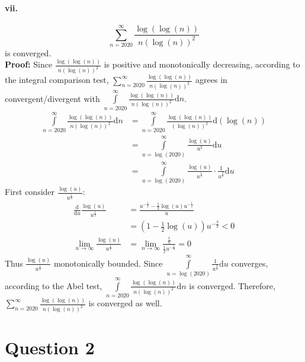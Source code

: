 \documentclass[11pt, a4paper]{article}
\begin{document}
\paragraph{vii.}
$$\sum\limits_{n=2020}^\infty \frac{\log(\log(n))}{n(\log(n))^2}$$
is converged. \\
\textbf{Proof:} Since $\frac{\log(\log(n))}{n(\log(n))^2}$ is positive and monotonically decreasing, according to the integral comparison test, $\sum\limits_{n=2020}^\infty \frac{\log(\log(n))}{n(\log(n))^2}$ agrees in convergent/divergent with $\int\limits_{n=2020}^\infty \frac{\log(\log(n))}{n(\log(n))^2} \mathrm{d}n$.
$$\begin{aligned}
    \int\limits_{n=2020}^\infty \frac{\log(\log(n))}{n(\log(n))^2} \mathrm{d}n &= \int\limits_{n=2020}^\infty \frac{\log(\log(n))}{(\log(n))^2} \mathrm{d}(\log(n)) \\
    &= \int\limits_{u=\log(2020)}^\infty \frac{\log(u)}{u^2}\mathrm{d}u \\
    &= \int\limits_{u=\log(2020)}^\infty \frac{\log(u)}{u^{\frac{1}{2}}} \cdot \frac{1}{u^{\frac{3}{2}}}\mathrm{d}u
\end{aligned}$$
First consider $\frac{\log(u)}{u^{\frac{1}{2}}}$:
$$\begin{aligned}
    \frac{\mathrm{d}}{\mathrm{d}u} \frac{\log(u)}{u^{\frac{1}{2}}} &= \frac{u^{-\frac{1}{2}} - \frac{1}{2}\log(u)u^{-\frac{1}{2}}}{u} \\
    &= (1 - \frac{1}{2}\log(u))u^{-\frac{3}{2}} < 0 \\
    \lim\limits_{n \to \infty} \frac{\log(u)}{u^{\frac{1}{2}}} &= \lim\limits_{n \to \infty} \frac{\frac{1}{u}}{\frac{1}{2}u^{-\frac{1}{2}}} = 0
\end{aligned}$$
Thus $\frac{\log(u)}{u^{\frac{1}{2}}}$ monotonically bounded. Since $\int\limits_{u=\log(2020)}^\infty \frac{1}{u^{\frac{3}{2}}}\mathrm{d}u$ converges, according to the Abel test, $\int\limits_{n=2020}^\infty \frac{\log(\log(n))}{n(\log(n))^2} \mathrm{d}n$ is converged. Therefore, $\sum\limits_{n=2020}^\infty \frac{\log(\log(n))}{n(\log(n))^2}$ is converged as well.


\section*{Question 2}
\end{document}
